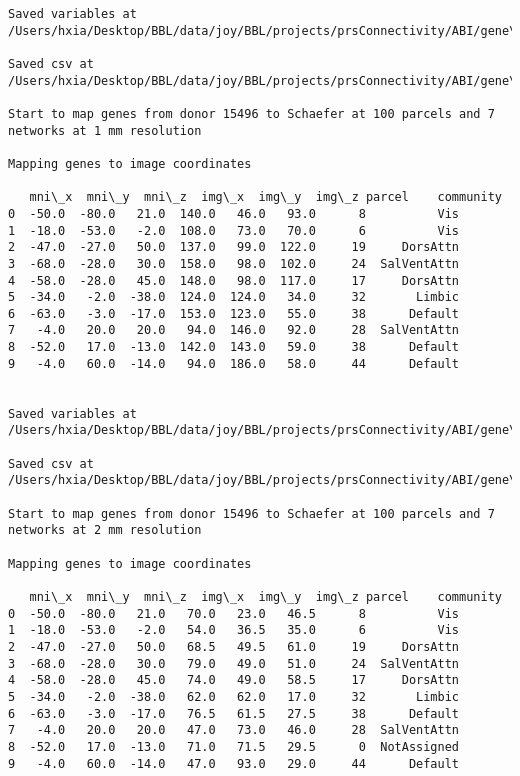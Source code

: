 \documentclass[11pt]{article}
\begin{document}
\begin{Verbatim}[commandchars=\\\{\}]
Saved variables at /Users/hxia/Desktop/BBL/data/joy/BBL/projects/prsConnectivity/ABI/gene\_mapping/14380donor\_800Parcels\_17Network\_2mm.pkl

Saved csv at /Users/hxia/Desktop/BBL/data/joy/BBL/projects/prsConnectivity/ABI/gene\_mapping/14380donor\_800Parcels\_17Network\_2mm.csv

Start to map genes from donor 15496 to Schaefer at 100 parcels and 7 networks at 1 mm resolution

Mapping genes to image coordinates

   mni\_x  mni\_y  mni\_z  img\_x  img\_y  img\_z parcel    community
0  -50.0  -80.0   21.0  140.0   46.0   93.0      8          Vis
1  -18.0  -53.0   -2.0  108.0   73.0   70.0      6          Vis
2  -47.0  -27.0   50.0  137.0   99.0  122.0     19     DorsAttn
3  -68.0  -28.0   30.0  158.0   98.0  102.0     24  SalVentAttn
4  -58.0  -28.0   45.0  148.0   98.0  117.0     17     DorsAttn
5  -34.0   -2.0  -38.0  124.0  124.0   34.0     32       Limbic
6  -63.0   -3.0  -17.0  153.0  123.0   55.0     38      Default
7   -4.0   20.0   20.0   94.0  146.0   92.0     28  SalVentAttn
8  -52.0   17.0  -13.0  142.0  143.0   59.0     38      Default
9   -4.0   60.0  -14.0   94.0  186.0   58.0     44      Default


Saved variables at /Users/hxia/Desktop/BBL/data/joy/BBL/projects/prsConnectivity/ABI/gene\_mapping/15496donor\_100Parcels\_7Network\_1mm.pkl

Saved csv at /Users/hxia/Desktop/BBL/data/joy/BBL/projects/prsConnectivity/ABI/gene\_mapping/15496donor\_100Parcels\_7Network\_1mm.csv

Start to map genes from donor 15496 to Schaefer at 100 parcels and 7 networks at 2 mm resolution

Mapping genes to image coordinates

   mni\_x  mni\_y  mni\_z  img\_x  img\_y  img\_z parcel    community
0  -50.0  -80.0   21.0   70.0   23.0   46.5      8          Vis
1  -18.0  -53.0   -2.0   54.0   36.5   35.0      6          Vis
2  -47.0  -27.0   50.0   68.5   49.5   61.0     19     DorsAttn
3  -68.0  -28.0   30.0   79.0   49.0   51.0     24  SalVentAttn
4  -58.0  -28.0   45.0   74.0   49.0   58.5     17     DorsAttn
5  -34.0   -2.0  -38.0   62.0   62.0   17.0     32       Limbic
6  -63.0   -3.0  -17.0   76.5   61.5   27.5     38      Default
7   -4.0   20.0   20.0   47.0   73.0   46.0     28  SalVentAttn
8  -52.0   17.0  -13.0   71.0   71.5   29.5      0  NotAssigned
9   -4.0   60.0  -14.0   47.0   93.0   29.0     44      Default



\end{Verbatim}
\end{document}
